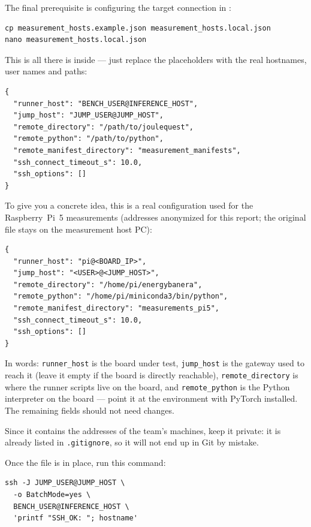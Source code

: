 The final prerequisite is configuring the target connection in :

\begin{lstlisting}
cp measurement_hosts.example.json measurement_hosts.local.json
nano measurement_hosts.local.json
\end{lstlisting}

This is all there is inside --- just replace the placeholders with the real
hostnames, user names and paths:

\begin{lstlisting}
{
  "runner_host": "BENCH_USER@INFERENCE_HOST",
  "jump_host": "JUMP_USER@JUMP_HOST",
  "remote_directory": "/path/to/joulequest",
  "remote_python": "/path/to/python",
  "remote_manifest_directory": "measurement_manifests",
  "ssh_connect_timeout_s": 10.0,
  "ssh_options": []
}
\end{lstlisting}

To give you a concrete idea, this is a real configuration used for the
Raspberry~Pi~5 measurements (addresses anonymized for this report; the
original file stays on the measurement host PC):

\begin{lstlisting}
{
  "runner_host": "pi@<BOARD_IP>",
  "jump_host": "<USER>@<JUMP_HOST>",
  "remote_directory": "/home/pi/energybanera",
  "remote_python": "/home/pi/miniconda3/bin/python",
  "remote_manifest_directory": "measurements_pi5",
  "ssh_connect_timeout_s": 10.0,
  "ssh_options": []
}
\end{lstlisting}

In words: \texttt{runner\_host} is the board under test,
\texttt{jump\_host} is the gateway used to reach it (leave it empty if the
board is directly reachable), \texttt{remote\_directory} is where the
runner scripts live on the board, and \texttt{remote\_python} is the Python
interpreter on the board --- point it at the environment with PyTorch
installed. The remaining fields should not need changes.

Since it contains the addresses of the team's machines, keep it private: it
is already listed in \texttt{.gitignore}, so it will not end up in Git by mistake.

Once the file is in place, run this command:

\begin{lstlisting}
ssh -J JUMP_USER@JUMP_HOST \
  -o BatchMode=yes \
  BENCH_USER@INFERENCE_HOST \
  'printf "SSH_OK: "; hostname'
\end{lstlisting}

